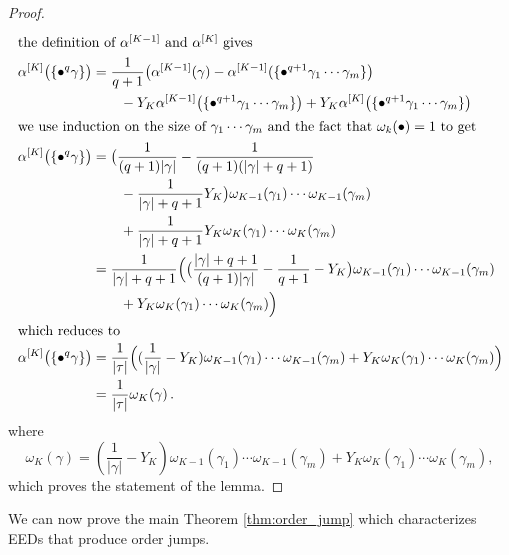 \documentclass[sn-mathphys-num]{sn-jnl}%
\newcommand{\reva}[1]{#1}%
\theoremstyle{thmstyleone}%
\theoremstyle{thmstyletwo}%
\theoremstyle{thmstylethree}%
\begin{document}
\begin{proof}
\begin{align*}
        \shortintertext{the definition of $\alpha^{[K-1]}$ and $\alpha^{[K]}$ gives}
        \alpha^{[K]} \big( \reva{\{\bullet^q \gamma\}} \big)&= \frac{1}{q+1} \big( \alpha^{[K-1]} (\gamma) - \alpha^{[K-1]} (\reva{\{\bullet^{q+1} \gamma_1 \cdots \gamma_m\}} \big) \\
                                                            &\quad \quad - Y_K \alpha^{[K-1]} \big( \reva{\{\bullet^{q+1} \gamma_1 \cdots \gamma_m\}} \big) + Y_K \alpha^{[K]} \big( \reva{\{\bullet^{q+1} \gamma_1 \cdots \gamma_m\}} \big) \\
        \shortintertext{we use induction on the size of $\reva{\gamma_1 \cdots \gamma_m}$ and the fact that $\omega_k (\bullet) = 1$ to get}
    \alpha^{[K]} \big( \reva{\{\bullet^q \gamma\}} \big) &= \big(\frac{1}{(q+1)|\gamma|} - \frac{1}{(q + 1)(|\gamma| + q + 1)} \\
                                                         &\quad\quad - \frac{1}{|\gamma| + q + 1} Y_K \big) \reva{\omega_{K-1} (\gamma_1) \cdots \omega_{K-1} (\gamma_m)} \\
                                                             &\quad\quad + \frac{1}{|\gamma| + q + 1} Y_K \reva{\omega_K (\gamma_1) \cdots \omega_K (\gamma_m)} \\
                                                             &= \frac{1}{|\gamma| + q + 1} \Big( \big( \frac{|\gamma| + q + 1}{(q+1)|\gamma|} - \frac{1}{q+1} - Y_K \big) \reva{\omega_{K-1} (\gamma_1) \cdots \omega_{K-1} (\gamma_m)} \\
        &\quad\quad + Y_K \reva{\omega_K (\gamma_1) \cdots \omega_K (\gamma_m)} \Big) \\
        \shortintertext{which reduces to}
        \alpha^{[K]} \big( \reva{\{\bullet^q \gamma\}} \big) &= \frac{1}{|\tau|} \Big( (\frac{1}{|\gamma|} - Y_K) \reva{\omega_{K-1} (\gamma_1) \cdots \omega_{K-1} (\gamma_m)} + Y_K \reva{\omega_K (\gamma_1) \cdots \omega_K (\gamma_m)} \Big) \\
                                                             &= \reva{\frac{1}{|\tau|} \omega_K(\gamma)} \,.
    \end{align*}
    where 
    \[ \omega_K (\gamma) = (\frac{1}{|\gamma|} - Y_K) \reva{\omega_{K-1} (\gamma_1) \cdots \omega_{K-1} (\gamma_m)} + Y_K \reva{\omega_K (\gamma_1) \cdots \omega_K (\gamma_m)}, \]
    which proves the statement of the lemma.
\end{proof}

We can now prove the \reva{main Theorem \ref{thm:order_jump} which characterizes EEDs that produce order jumps.}
\end{document}
